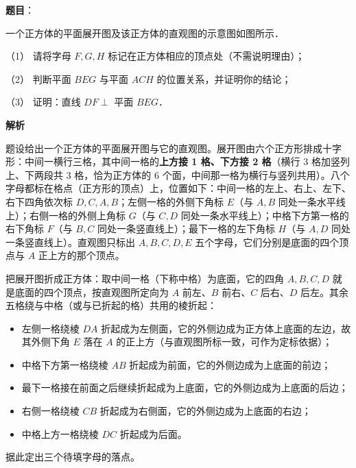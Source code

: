 \begin{answer}

\textbf{题目}：

一个正方体的平面展开图及该正方体的直观图的示意图如图所示．
\nopagebreak[4]
\begin{center}\end{center}
\nopagebreak[4]
（1） 请将字母 \(F,G,H\) 标记在正方体相应的顶点处（不需说明理由）；

（2） 判断平面 \(BEG\) 与平面 \(ACH\) 的位置关系，并证明你的结论；

（3） 证明：直线 \(DF\perp\) 平面 \(BEG\)．

\textbf{解析}

题设给出一个正方体的平面展开图与它的直观图。展开图由六个正方形排成十字形：中间一横行三格，其中间一格的\textbf{上方接 1 格、下方接 2 格}（横行 3 格加竖列上、下两段共 3 格，恰为正方体的 6 个面，中间那一格为横行与竖列共用）。八个字母都标在格点（正方形的顶点）上，位置如下：中间一格的左上、右上、左下、右下四角依次标 \(D,C,A,B\)；左侧一格的外侧下角标 \(E\)（与 \(A,B\) 同处一条水平线上）；右侧一格的外侧上角标 \(G\)（与 \(C,D\) 同处一条水平线上）；中格下方第一格的右下角标 \(F\)（与 \(B,C\) 同处一条竖直线上）；最下一格的左下角标 \(H\)（与 \(A,D\) 同处一条竖直线上）。直观图只标出 \(A,B,C,D,E\) 五个字母，它们分别是底面的四个顶点与 \(A\) 正上方的那个顶点。


把展开图折成正方体：取中间一格（下称中格）为底面，它的四角 \(A,B,C,D\) 就是底面的四个顶点，按直观图所定向为 \(A\) 前左、\(B\) 前右、\(C\) 后右、\(D\) 后左。其余五格绕与中格（或与已折起的格）共用的棱折起：

\begin{itemize}
\item 左侧一格绕棱 \(DA\) 折起成为左侧面，它的外侧边成为正方体上底面的左边，故其外侧下角 \(E\) 落在 \(A\) 的正上方（与直观图所标一致，可作为定标依据）；
\item 中格下方第一格绕棱 \(AB\) 折起成为前面，它的外侧边成为上底面的前边；
\item 最下一格接在前面之后继续折起成为上底面，它的外侧边成为上底面的后边；
\item 右侧一格绕棱 \(CB\) 折起成为右侧面，它的外侧边成为上底面的右边；
\item 中格上方一格绕棱 \(DC\) 折起成为后面。
\end{itemize}

据此定出三个待填字母的落点。


\end{answer}
